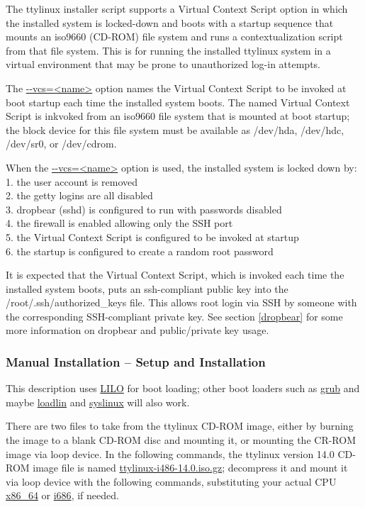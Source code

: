 \documentclass[10pt]{article}
\begin{document}
The ttylinux installer script supports a Virtual Context Script option in which
the installed system is locked-down and boots with a startup sequence that
mounts an iso9660 (CD-ROM) file system and runs a contextualization script from
that file system. This is for running the installed ttylinux system in a
virtual environment that may be prone to unauthorized log-in attempts.

The \url{--vcs=<name>} option names the Virtual Context Script to be invoked at
boot startup each time the installed system boots. The named Virtual Context
Script is inkvoked from an iso9660 file system that is mounted at boot startup;
the block device for this file system must be available as /dev/hda, /dev/hdc,
/dev/sr0, or /dev/cdrom.

When the \url{--vcs=<name>} option is used, the installed system is locked down
by:\\
1. the user account is removed\\
2. the getty logins are all disabled\\
3. dropbear (sshd) is configured to run with passwords disabled\\
4. the firewall is enabled allowing only the SSH port\\
5. the Virtual Context Script is configured to be invoked at startup\\
6. the startup is configured to create a random root password

It is expected that the Virtual Context Script, which is invoked each time the
installed system boots, puts an ssh-compliant public key into the
/root/.ssh/authorized\_keys file. This allows root login via SSH by someone
with the corresponding SSH-compliant private key. See section \ref{dropbear}
for some more information on dropbear and public/private key usage.
 
\subsubsection{Manual Installation -- Setup and Installation}

This description uses \url{LILO} for boot loading; other boot loaders such as
\url{grub} and maybe \url{loadlin} and \url{syslinux} will also work.

There are two files to take from the ttylinux CD-ROM image, either by burning
the image to a blank CD-ROM disc and mounting it, or mounting the CR-ROM image
via loop device. In the following commands, the ttylinux version 14.0 CD-ROM
image file is named \url{ttylinux-i486-14.0.iso.gz}; decompress it and mount it
via loop device with the following commands, substituting your actual CPU
\url{x86_64} or \url{i686}, if needed.
\end{document}
